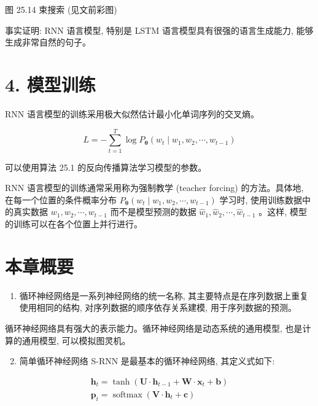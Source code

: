 \documentclass[10pt]{article}
\begin{document}
图 25.14 束搜索 (见文前彩图)

事实证明: RNN 语言模型, 特别是 LSTM 语言模型具有很强的语言生成能力, 能够生成非常自然的句子。

\section*{4. 模型训练}
RNN 语言模型的训练采用极大似然估计最小化单词序列的交叉熵。


\begin{equation*}
L=-\sum_{t=1}^{T} \log P_{\boldsymbol{\theta}}\left(w_{t} \mid w_{1}, w_{2}, \cdots, w_{t-1}\right) \tag{25.52}
\end{equation*}


可以使用算法 25.1 的反向传播算法学习模型的参数。

RNN 语言模型的训练通常采用称为强制教学 (teacher forcing) 的方法。具体地, 在每一个位置的条件概率分布 $P_{\boldsymbol{\theta}}\left(w_{t} \mid w_{1}, w_{2}, \cdots, w_{t-1}\right)$ 学习时, 使用训练数据中的真实数据 $w_{1}, w_{2}, \cdots, w_{t-1}$ 而不是模型预测的数据 $\hat{w}_{1}, \hat{w}_{2}, \cdots, \hat{w}_{t-1}$ 。这样, 模型的训练可以在各个位置上并行进行。

\section*{本章概要}
\begin{enumerate}
  \item 循环神经网络是一系列神经网络的统一名称, 其主要特点是在序列数据上重复使用相同的结构, 对序列数据的顺序依存关系建模, 用于序列数据的预测。
\end{enumerate}

循环神经网络具有强大的表示能力。循环神经网络是动态系统的通用模型, 也是计算的通用模型, 可以模拟图灵机。

\begin{enumerate}
  \setcounter{enumi}{1}
  \item 简单循环神经网络 S-RNN 是最基本的循环神经网络, 其定义式如下:
\end{enumerate}

$$
\begin{gathered}
\boldsymbol{h}_{t}=\tanh \left(\boldsymbol{U} \cdot \boldsymbol{h}_{t-1}+\boldsymbol{W} \cdot \boldsymbol{x}_{t}+\boldsymbol{b}\right) \\
\boldsymbol{p}_{t}=\operatorname{softmax}\left(\boldsymbol{V} \cdot \boldsymbol{h}_{t}+\boldsymbol{c}\right)
\end{gathered}
$$
\end{document}
